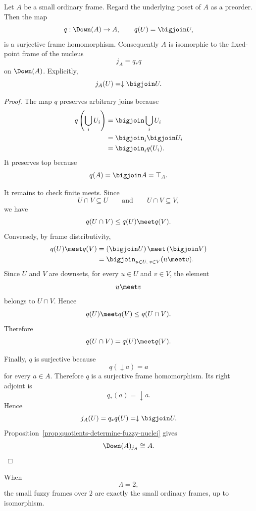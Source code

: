 \begin{theorem}
\label{thm:ordinary-frames-localized-presheaves}
Let \(A\) be a small ordinary frame. Regard the underlying poset of \(A\) as a
preorder. Then the map
\[
    q:\Down(A)\to A,
    \qquad
    q(U)=\bigjoin U,
\]
is a surjective frame homomorphism. Consequently \(A\) is isomorphic to the
fixed-point frame of the nucleus
\[
    j_A=q_\ast q
\]
on \(\Down(A)\). Explicitly,
\[
    j_A(U)=\downarrow\bigjoin U.
\]
\end{theorem}

\begin{proof}
The map \(q\) preserves arbitrary joins because
\[
\begin{aligned}
q\left(\bigcup_i U_i\right)
&=
\bigjoin\bigcup_i U_i
\\
&=
\bigjoin_i\bigjoin U_i
\\
&=
\bigjoin_i q(U_i).
\end{aligned}
\]
It preserves top because
\[
    q(A)=\bigjoin A=\top_A.
\]

It remains to check finite meets. Since
\[
    U\cap V\subseteq U
    \qquad\text{and}\qquad
    U\cap V\subseteq V,
\]
we have
\[
    q(U\cap V)\leq q(U)\meet q(V).
\]
Conversely, by frame distributivity,
\[
\begin{aligned}
q(U)\meet q(V)
&=
\left(\bigjoin U\right)\meet\left(\bigjoin V\right)
\\
&=
\bigjoin_{u\in U,\;v\in V}(u\meet v).
\end{aligned}
\]
Since \(U\) and \(V\) are downsets, for every \(u\in U\) and \(v\in V\), the element
\[
    u\meet v
\]
belongs to \(U\cap V\). Hence
\[
    q(U)\meet q(V)\leq q(U\cap V).
\]
Therefore
\[
    q(U\cap V)=q(U)\meet q(V).
\]

Finally, \(q\) is surjective because
\[
    q(\downarrow a)=a
\]
for every \(a\in A\). Therefore \(q\) is a surjective frame homomorphism. Its right
adjoint is
\[
    q_\ast(a)=\downarrow a.
\]
Hence
\[
    j_A(U)
    =
    q_\ast q(U)
    =
    \downarrow\bigjoin U.
\]
Proposition~\ref{prop:quotients-determine-fuzzy-nuclei} gives
\[
    \Down(A)_{j_A}\cong A.
\]
\end{proof}

\begin{theorem}
\label{thm:crisp-case-recovers-ordinary-frames}
When
\[
    \Lambda=2,
\]
the small fuzzy frames over \(2\) are exactly the small ordinary frames, up to
isomorphism.
\end{theorem}


